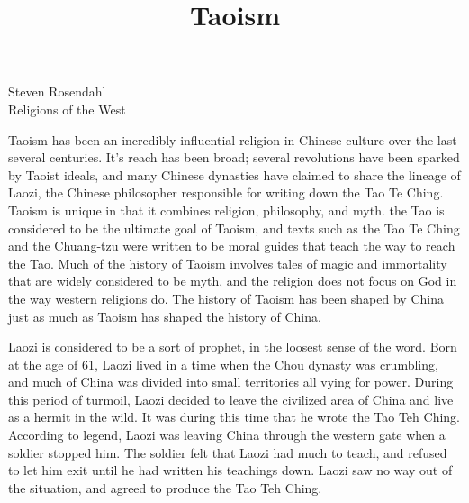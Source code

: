 \documentclass[12pt]{article}
\title{Taoism}
\date{}
\newcommand{\inlinetitle}{\vspace{-1.5cm}{\let\newpage\relax\maketitle}\vspace{-1.5cm}}
\begin{document}
\noindent Steven Rosendahl\\
\noindent Religions of the West\\
\inlinetitle

Taoism has been an incredibly influential religion in Chinese culture over the last several centuries. It's reach has been broad; several revolutions have been sparked by Taoist ideals, and many Chinese dynasties have claimed to share the lineage of Laozi, the Chinese philosopher responsible for writing down the Tao Te Ching. Taoism is unique in that it combines religion, philosophy, and myth. the Tao is considered to be the ultimate goal of Taoism, and texts such as the Tao Te Ching and the Chuang-tzu were written to be moral guides that teach the way to reach the Tao. Much of the history of Taoism involves tales of magic and immortality that are widely considered to be myth, and the religion does not focus on God in the way western religions do. The history of Taoism has been shaped by China just as much as Taoism has shaped the history of China.

Laozi is considered to be a sort of prophet, in the loosest sense of the word. Born at the age of 61, Laozi lived in a time when the Chou dynasty was crumbling, and much of China was divided into small territories all vying for power. During this period of turmoil, Laozi decided to leave the civilized area of China and live as a hermit in the wild. It was during this time that he wrote the Tao Teh Ching. According to legend, Laozi was leaving China through the western gate when a soldier stopped him. The soldier felt that Laozi had much to teach, and refused to let him exit until he had written his teachings down. Laozi saw no way out of the situation, and agreed to produce the Tao Teh Ching.
\end{document}
